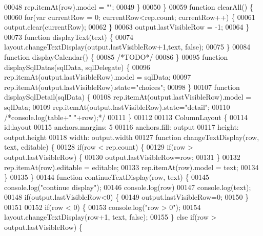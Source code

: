 \begin{DoxyCode}
00048             rep.itemAt(row).model = \textcolor{stringliteral}{""};
00049         \}
00050     \}
00059     \textcolor{keyword}{function} clearAll() \{
00060         \textcolor{keywordflow}{for}(var currentRow = 0; currentRow<rep.count; currentRow++) \{
00061             output.clear(currentRow);
00062         \}
00063         output.lastVisibleRow = -1;
00064     \}
00073     \textcolor{keyword}{function} displayText(text) \{
00074         layout.changeTextDisplay(output.lastVisibleRow+1,text, \textcolor{keyword}{false});
00075     \}
00084     \textcolor{keyword}{function} displayCalendar() \{
00085         \textcolor{comment}{/*TODO*/}
00086     \}
00095     \textcolor{keyword}{function} displaySqlDatas(sqlData, sqlDelegate) \{
00096         rep.itemAt(output.lastVisibleRow).model = sqlData;
00097         rep.itemAt(output.lastVisibleRow).state=\textcolor{stringliteral}{"choices"};
00098     \}
00107     \textcolor{keyword}{function} displaySqlDetail(sqlData) \{
00108         rep.itemAt(output.lastVisibleRow).model = sqlData;
00109         rep.itemAt(output.lastVisibleRow).state=\textcolor{stringliteral}{"detail"};
00110         \textcolor{comment}{/*console.log(table+" "+row);*/}
00111     \}
00112 
00113     ColumnLayout \{
00114         \textcolor{keywordtype}{id}:layout
00115         anchors.margins: 5
00116         anchors.fill: output
00117         height: output.height
00118         width: output.width
00127         \textcolor{keyword}{function} changeTextDisplay(row, text, editable) \{
00128             \textcolor{keywordflow}{if}(row < rep.count) \{
00129                 \textcolor{keywordflow}{if}(row > output.lastVisibleRow) \{
00130                     output.lastVisibleRow=row;
00131                 \}
00132                 rep.itemAt(row).editable = editable;
00133                 rep.itemAt(row).model = text;
00134             \}
00135         \}
00144         \textcolor{keyword}{function} continueTextDisplay(row, text) \{
00145             console.log(\textcolor{stringliteral}{"continue display"});
00146             console.log(row)
00147             console.log(text);
00148             \textcolor{keywordflow}{if}(output.lastVisibleRow<0) \{
00149                 output.lastVisibleRow=0;
00150             \}
00151 
00152             \textcolor{keywordflow}{if}(row < 0) \{
00153                 console.log(\textcolor{stringliteral}{"row > 0"});
00154                 layout.changeTextDisplay(row+1, text, \textcolor{keyword}{false});
00155             \} \textcolor{keywordflow}{else} \textcolor{keywordflow}{if}(row > output.lastVisibleRow) \{

\end{DoxyCode}
